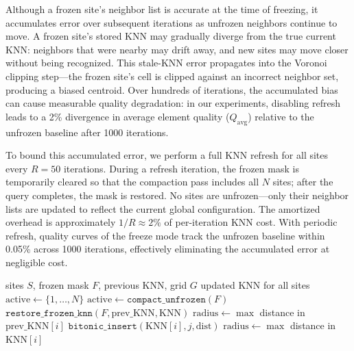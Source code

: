 Although a frozen site's neighbor list is accurate at the time of freezing, it accumulates error over subsequent iterations as unfrozen neighbors continue to move. A frozen site's stored KNN may gradually diverge from the true current KNN: neighbors that were nearby may drift away, and new sites may move closer without being recognized. This stale-KNN error propagates into the Voronoi clipping step---the frozen site's cell is clipped against an incorrect neighbor set, producing a biased centroid. Over hundreds of iterations, the accumulated bias can cause measurable quality degradation: in our experiments, disabling refresh leads to a 2\% divergence in average element quality ($Q_{\mathrm{avg}}$) relative to the unfrozen baseline after 1000 iterations.

To bound this accumulated error, we perform a full KNN refresh for all sites every $R = 50$ iterations. During a refresh iteration, the frozen mask is temporarily cleared so that the compaction pass includes all $N$ sites; after the query completes, the mask is restored. No sites are unfrozen---only their neighbor lists are updated to reflect the current global configuration. The amortized overhead is approximately $1/R \approx 2\%$ of per-iteration KNN cost. With periodic refresh, quality curves of the freeze mode track the unfrozen baseline within 0.05\% across 1000 iterations, effectively eliminating the accumulated error at negligible cost.

\begin{algorithm}[t]
\caption{Freeze-Aware Bitonic KNN}
\label{alg:freeze_knn}
\begin{algorithmic}[1]
\Require sites $S$, frozen mask $F$, previous KNN, grid $G$
\Ensure updated KNN for all sites
 
    \State $\text{active} \gets \{1, \ldots, N\}$
\Else
    \State $\text{active} \gets \texttt{compact\_unfrozen}(F)$ 
    \State $\texttt{restore\_frozen\_knn}(F, \text{prev\_KNN}, \text{KNN})$
\EndIf
{}
    \State $\text{radius} \gets \max$ distance in $\text{prev\_KNN}[i]$ 
                \State $\texttt{bitonic\_insert}(\text{KNN}[i], j, \text{dist})$
                \State $\text{radius} \gets \max$ distance in $\text{KNN}[i]$
            \EndIf
        \EndFor
    \EndFor
\EndFor
\end{algorithmic}
\end{algorithm}

